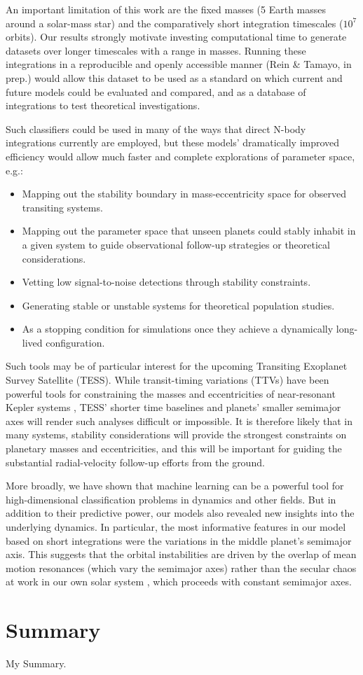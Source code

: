 An important limitation of this work are the fixed masses (5 Earth masses around a solar-mass star) and the comparatively short integration timescales ($10^7$ orbits).
Our results strongly motivate investing computational time to generate datasets over longer timescales with a range in masses.
Running these integrations in a reproducible and openly accessible manner (Rein \& Tamayo, in prep.) would allow this dataset to be used as a standard on which current and future models could be evaluated and compared, and as a database of integrations to test theoretical investigations.  

Such classifiers could be used in many of the ways that direct N-body integrations currently are employed, but these models' dramatically improved efficiency would allow much faster and complete explorations of parameter space, e.g.:
\begin{itemize}
	\item Mapping out the stability boundary in mass-eccentricity space for observed transiting systems.
	\item Mapping out the parameter space that unseen planets could stably inhabit in a given system to guide observational follow-up strategies or theoretical considerations.
	\item Vetting low signal-to-noise detections through stability constraints.
	\item Generating stable or unstable systems for theoretical population studies.
	\item As a stopping condition for simulations once they achieve a dynamically long-lived configuration.
\end{itemize}

Such tools may be of particular interest for the upcoming Transiting Exoplanet Survey Satellite (TESS).
While transit-timing variations (TTVs) have been powerful tools for constraining the masses and eccentricities of near-resonant Kepler systems \citep[e.g.,][]{Ford12, Steffen13, Deck15}, TESS' shorter time baselines and planets' smaller semimajor axes will render such analyses difficult or impossible.
It is therefore likely that in many systems, stability considerations will provide the strongest constraints on planetary masses and eccentricities, and this will be important for guiding the substantial radial-velocity follow-up efforts from the ground. 

More broadly, we have shown that machine learning can be a powerful tool for high-dimensional classification problems in dynamics and other fields.
But in addition to their predictive power, our models also revealed new insights into the underlying dynamics.
In particular, the most informative features in our model based on short integrations were the variations in the middle planet's semimajor axis.
This suggests that the orbital instabilities are driven by the overlap of mean motion resonances (which vary the semimajor axes) rather than the secular chaos at work in our own solar system \citep{Lithwick11secularchaos, Batygin15}, which proceeds with constant semimajor axes.

\section{Summary }

My Summary.